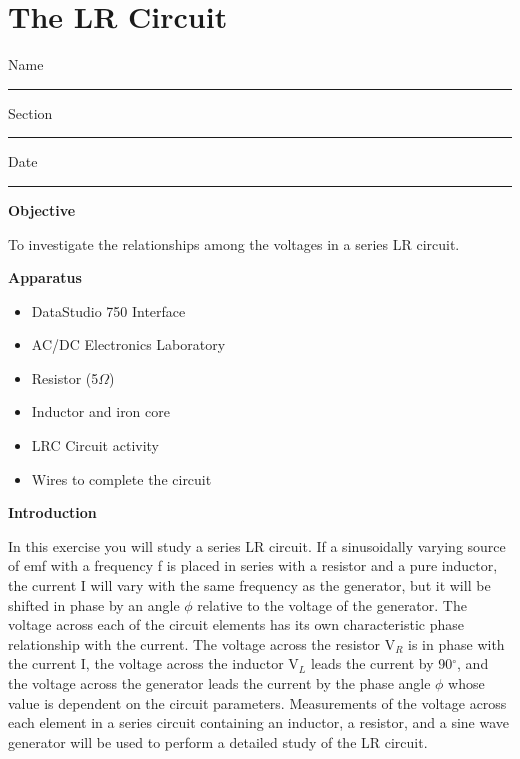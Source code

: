 
\section{The LR Circuit}

Name \rule{2.0in}{0.1pt}\hfill{}Section \rule{1.0in}{0.1pt}\hfill{}Date
\rule{1.0in}{0.1pt}

\textbf{Objective} 

To investigate the relationships among the voltages in a series LR
circuit.

\textbf{Apparatus} 

\begin{itemize}
\item DataStudio 750 Interface
\item AC/DC Electronics Laboratory
\item Resistor (5$\Omega$)
\item Inductor and iron core 
\item LRC Circuit activity
\item Wires to complete the circuit
\end{itemize}
\textbf{Introduction} 

In this exercise you will study a series LR circuit. If a sinusoidally
varying source of emf with a frequency f is placed in series with
a resistor and a pure inductor, the current I will vary with the same
frequency as the generator, but it will be shifted in phase by an
angle \( \phi  \) relative to the voltage of the generator. The voltage
across each of the circuit elements has its own characteristic phase
relationship with the current. The voltage across the resistor V\( _{R} \)
is in phase with the current I, the voltage across the inductor V\( _{L} \)
leads the current by 90\( ^{\circ } \), and the voltage across the
generator leads the current by the phase angle \( \phi  \) whose
value is dependent on the circuit parameters. Measurements of the
voltage across each element in a series circuit containing an inductor,
a resistor, and a sine wave generator will be used to perform a detailed
study of the LR circuit.

\vspace{0.3cm}
{\centering {} \par}
\vspace{0.3cm}

